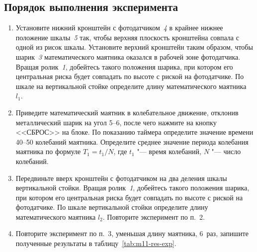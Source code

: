 \documentclass[a4paper, 12pt]{extarticle}
\begin{document}
\subsection{Порядок выполнения эксперимента}
\begin{enumerate}
\item Установите нижний кронштейн с фотодатчиком~\emph{4} в крайнее нижнее положение шкалы~\emph{5} так, чтобы верхняя плоскость кронштейна совпала с одной из рисок шкалы. Установите верхний кронштейн таким образом, чтобы шарик~\emph{3} математического маятника оказался в рабочей зоне фотодатчика. Вращая  ролик~\emph{1}, добейтесь такого положения шарика, при котором его центральная риска будет совпадать по высоте с риской на     фотодатчике. По шкале на вертикальной стойке определите длину математического маятника~$l_1$.
\item Приведите математический маятник в колебательное движение, отклонив металлический шарик на угол 5--6\degree, после чего нажмите на кнопку <<СБРОС>> на блоке. По показанию таймера определите значение времени 40--50 колебаний маятника. Определите среднее значение периода колебания маятника по формуле $T_1 = t_1 / N$, где $t_1$ "--- время колебаний, $N$ "--- число колебаний. %
\item Передвиньте вверх кронштейн с фотодатчиком на два деления шкалы вертикальной стойки. Вращая ролик~\emph{1}, добейтесь такого положения шарика, при котором его центральная риска будет совпадать по высоте с риской  на фотодатчике. По шкале вертикальной стойки определите длину математического маятника $l_2$. Повторите эксперимент по п.~2. 
\item Повторите эксперимент по п.~3, уменьшая длину маятника, 6~раз, запишите  полученные результаты в таблицу~\ref{tab:m11-res-exp}. %


\end{enumerate}
\end{document}
